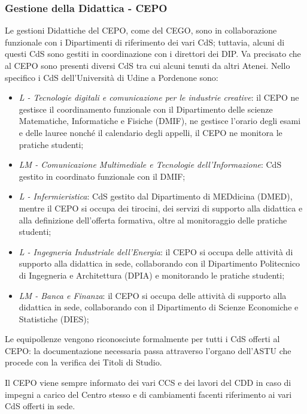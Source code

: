         \subsubsection{Gestione della Didattica - CEPO}
            Le gestioni Didattiche del CEPO, come del CEGO, sono in collaborazione funzionale con i Dipartimenti di riferimento dei vari CdS; tuttavia, alcuni di questi CdS sono gestiti in coordinazione con i direttori dei DIP. Va precisato che al CEPO sono presenti diversi CdS tra cui alcuni tenuti da altri Atenei. \newline
            Nello specifico i CdS dell'Università di Udine a Pordenone sono: 
            \begin{itemize} 
                \item \textsl{L - Tecnologie digitali e comunicazione per le industrie creative}: il CEPO ne gestisce il coordinamento funzionale con il Dipartimento delle scienze Matematiche, Informatiche e Fisiche (DMIF), ne gestisce l'orario degli esami e delle lauree nonché il calendario degli appelli, il CEPO ne monitora le pratiche studenti; 
                \item \textsl{LM - Comunicazione Multimediale e Tecnologie dell'Informazione}: CdS gestito in coordinato funzionale con il DMIF; 
                \item \textsl{L - Infermieristica}: CdS gestito dal Dipartimento di MEDdicina (DMED), mentre il CEPO si occupa dei tirocini, dei servizi di supporto alla didattica e alla definizione dell'offerta formativa, oltre al monitoraggio delle pratiche studenti; 
                \item \textsl{L - Ingegneria Industriale dell'Energia}: il CEPO si occupa delle attività di supporto alla didattica in sede, collaborando con il Dipartimento Politecnico di Ingegneria e Architettura (DPIA) e monitorando le pratiche studenti; 
                \item \textsl{LM - Banca e Finanza}: il CEPO si occupa delle attività di supporto alla didattica in sede, collaborando con il Dipartimento di Scienze Economiche e Statistiche (DIES);
            \end{itemize}
            Le equipollenze vengono riconosciute formalmente per tutti i CdS offerti al CEPO: la documentazione necessaria passa attraverso l'organo dell'ASTU che procede con la verifica dei Titoli di Studio. 
        \par
            Il CEPO viene sempre informato dei vari CCS e dei lavori del CDD in caso di impegni a carico del Centro stesso e di cambiamenti facenti riferimento ai vari CdS offerti in sede.\newline
